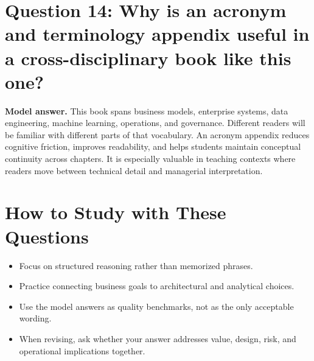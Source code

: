 \section*{Question 14: Why is an acronym and terminology appendix useful in a cross-disciplinary book like this one?}
\textbf{Model answer.}
This book spans business models, enterprise systems, data engineering, machine learning, operations, and governance.
Different readers will be familiar with different parts of that vocabulary.
An acronym appendix reduces cognitive friction, improves readability, and helps students maintain conceptual continuity across chapters.
It is especially valuable in teaching contexts where readers move between technical detail and managerial interpretation.

\section*{How to Study with These Questions}
\begin{itemize}
  \item Focus on structured reasoning rather than memorized phrases.
  \item Practice connecting business goals to architectural and analytical choices.
  \item Use the model answers as quality benchmarks, not as the only acceptable wording.
  \item When revising, ask whether your answer addresses value, design, risk, and operational implications together.
\end{itemize}
